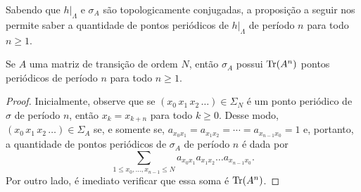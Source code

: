 Sabendo que $h|_\Lambda$ e $\sigma_A$ são topologicamente conjugadas, a proposição a seguir nos permite saber a quantidade de pontos periódicos de $h|_\Lambda$ de período $n$ para todo $n \geq 1$.

\begin{proposition}
Se $A$ uma matriz de transição de ordem $N$, então $\sigma_A$ possui $\operatorname{Tr}(A^n)$ pontos periódicos de período $n$ para todo $n \geq 1$.
\end{proposition}


\begin{proof}
Inicialmente, observe que se $(x_0 \, x_1 \, x_2 \, \dots) \in \Sigma_N$ é um ponto periódico de $\sigma$ de período $n$, então $x_k = x_{k+n}$ para todo $k \geq 0$.
Desse modo, $(x_0 \, x_1 \, x_2 \, \dots) \in \Sigma_A$ se, e somente se, $a_{x_0 x_1} = a_{x_1 x_2} = \cdots = a_{x_{n-1} x_0} = 1$ e, portanto, a quantidade de pontos periódicos de $\sigma_A$ de período $n$ é dada por
$$\sum_{1 \leq x_0, \dots, x_{n-1} \leq N} a_{x_0 x_1} a_{x_1 x_2}  \dots a_{x_{n-1} x_0}.$$
Por outro lado, é imediato verificar que essa soma é $\operatorname{Tr}(A^n)$.
\end{proof}
